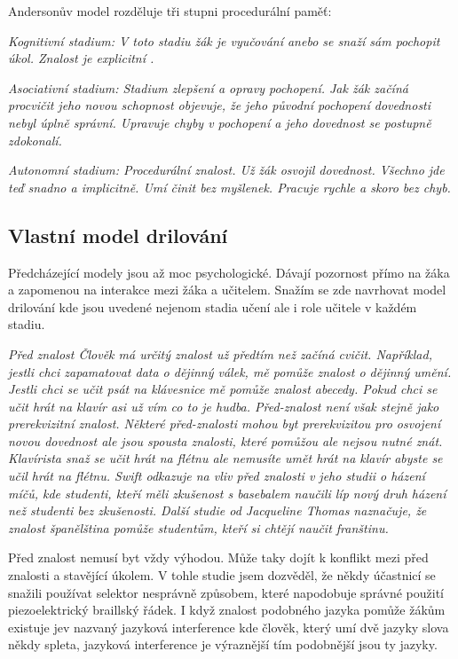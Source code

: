 Andersonův model rozděluje tři stupni procedurální paměť:

\em Kognitivní stadium\em : V toto stadiu žák je vyučování anebo se snaží sám pochopit úkol.  Znalost je explicitní .

\em Asociativní stadium\em : Stadium zlepšení a opravy pochopení.  Jak žák začíná procvičit jeho novou schopnost objevuje, že jeho původní pochopení dovednosti nebyl úplně správní.  Upravuje chyby v pochopení a jeho dovednost se postupně zdokonalí.

\em Autonomní stadium\em : Procedurální znalost.  Už žák osvojil dovednost. Všechno jde teď snadno a implicitně.  Umí činit bez myšlenek. Pracuje rychle a skoro bez chyb\citep{o1987some}.

\subsection{Vlastní model drilování}

Předcházející modely jsou až moc psychologické.  Dávají pozornost přímo na žáka a zapomenou na interakce mezi žáka a učitelem.  Snažím se zde navrhovat model drilování kde jsou uvedené nejenom stadia učení ale i role učitele v každém stadiu.

\em Před znalost \em Člověk má určitý znalost už předtím než začíná cvičit. Například, jestli chci zapamatovat data o dějinný válek, mě pomůže znalost o dějinný umění.  Jestli chci se učit psát na klávesnice mě pomůže znalost abecedy. Pokud chci se učit hrát na klavír asi už vím co to je hudba.  Před-znalost není však stejně jako prerekvizitní znalost.  Některé před-znalosti mohou byt prerekvizitou pro osvojení novou dovednost ale jsou spousta znalosti, které pomůžou ale nejsou nutné znát.  Klavírista snaž se učit hrát na flétnu ale nemusíte umět hrát na klavír abyste se učil hrát na flétnu.  Swift odkazuje na vliv před znalosti v jeho studii o házení míčů, kde studenti, kteří měli zkušenost s basebalem naučili líp nový druh házení než studenti bez zkušenosti. Další studie od Jacqueline Thomas naznačuje, že znalost španělština pomůže studentům, kteří si chtějí naučit franštinu\citep{swift1903studies,thomas1988role}.

Před znalost nemusí byt vždy výhodou. Může taky dojít k konflikt mezi před znalosti a stavějící úkolem. V tohle studie jsem dozvěděl, že někdy účastnicí se snažili používat selektor nesprávně způsobem, které napodobuje správné použití piezoelektrický braillský řádek.  I když znalost podobného jazyka pomůže žákům existuje jev nazvaný jazyková interference kde člověk, který umí dvě jazyky slova někdy spleta, jazyková interference je výraznější tím podobnější jsou ty jazyky\citep{brauer1998stroop}.

